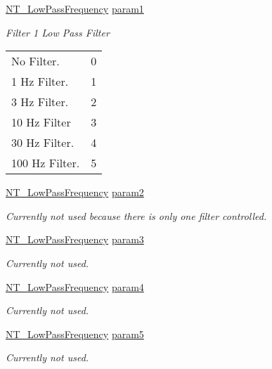 \begin{DoxyCompactItemize}
\item 
\hyperlink{group___common_ga5dcfcfcc977bb4f76ff0b66742371f2a}{N\+T\+\_\+\+Low\+Pass\+Frequency} \hyperlink{struct_n_t___low_pass_filter_parameters_ae1f60f73597aaf643f76b1cb981410d4}{param1}
\begin{DoxyCompactList}\small\item\em Filter 1 Low Pass Filter \tabulinesep=1mm
\begin{longtabu} spread 0pt [c]{*2{|X[-1]}|}
\hline
No Filter.&0 \\
1 Hz Filter.&1 \\
3 Hz Filter.&2 \\
10 Hz Filter&3 \\
30 Hz Filter.&4 \\
100 Hz Filter.&5 \\
\end{longtabu}
\end{DoxyCompactList}\item 
\hyperlink{group___common_ga5dcfcfcc977bb4f76ff0b66742371f2a}{N\+T\+\_\+\+Low\+Pass\+Frequency} \hyperlink{struct_n_t___low_pass_filter_parameters_a7fa8773351313647da35b160e36c2769}{param2}
\begin{DoxyCompactList}\small\item\em Currently not used because there is only one filter controlled. \end{DoxyCompactList}\item 
\hyperlink{group___common_ga5dcfcfcc977bb4f76ff0b66742371f2a}{N\+T\+\_\+\+Low\+Pass\+Frequency} \hyperlink{struct_n_t___low_pass_filter_parameters_a3ad4161a85bf1e0c62b4022740918ee6}{param3}
\begin{DoxyCompactList}\small\item\em Currently not used. \end{DoxyCompactList}\item 
\hyperlink{group___common_ga5dcfcfcc977bb4f76ff0b66742371f2a}{N\+T\+\_\+\+Low\+Pass\+Frequency} \hyperlink{struct_n_t___low_pass_filter_parameters_a4c86757a3acfd21449ff66a7f8c95460}{param4}
\begin{DoxyCompactList}\small\item\em Currently not used. \end{DoxyCompactList}\item 
\hyperlink{group___common_ga5dcfcfcc977bb4f76ff0b66742371f2a}{N\+T\+\_\+\+Low\+Pass\+Frequency} \hyperlink{struct_n_t___low_pass_filter_parameters_ae1f5409f3feb2130f60e0d44ed61c551}{param5}
\begin{DoxyCompactList}\small\item\em Currently not used. \end{DoxyCompactList}\end{DoxyCompactItemize}


